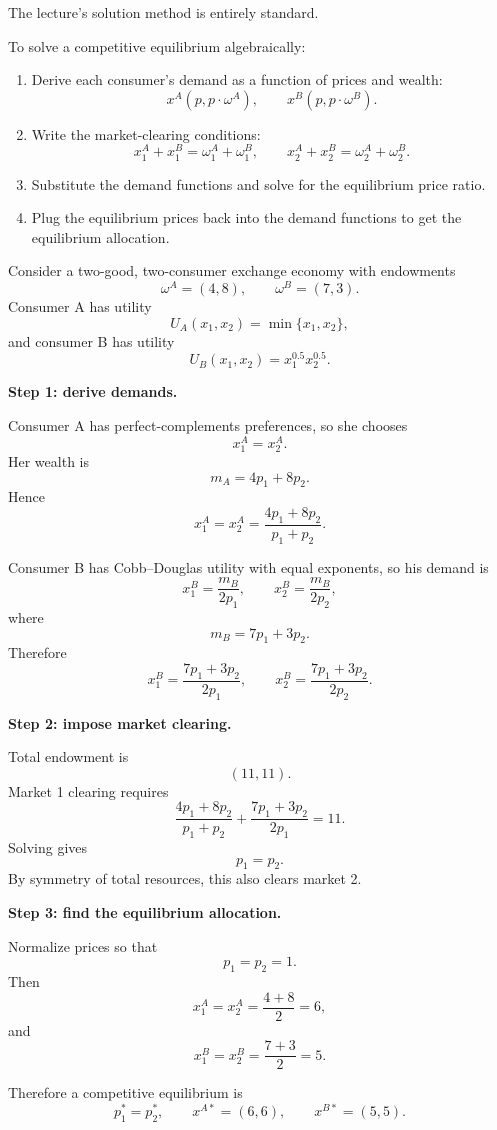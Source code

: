 The lecture's solution method is entirely standard.

\begin{examtip}[title={Method Pattern: Solving a 2-good, 2-consumer equilibrium}]
To solve a competitive equilibrium algebraically:
\begin{enumerate}
    \item Derive each consumer's demand as a function of prices and wealth:
    \[
    x^A(p,p\cdot \omega^A), \qquad x^B(p,p\cdot \omega^B).
    \]
    \item Write the market-clearing conditions:
    \[
    x_1^A + x_1^B = \omega_1^A+\omega_1^B,
    \qquad
    x_2^A + x_2^B = \omega_2^A+\omega_2^B.
    \]
    \item Substitute the demand functions and solve for the equilibrium price ratio.
    \item Plug the equilibrium prices back into the demand functions to get the equilibrium allocation.
\end{enumerate}
\end{examtip}

\begin{examplebox}[title={Worked Example: Solving for competitive equilibrium}]
Consider a two-good, two-consumer exchange economy with endowments
\[
\omega^A=(4,8),
\qquad
\omega^B=(7,3).
\]
Consumer A has utility
\[
U_A(x_1,x_2)=\min\{x_1,x_2\},
\]
and consumer B has utility
\[
U_B(x_1,x_2)=x_1^{0.5}x_2^{0.5}.
\]

\textbf{Step 1: derive demands.}

Consumer A has perfect-complements preferences, so she chooses
\[
x_1^A=x_2^A.
\]
Her wealth is
\[
m_A = 4p_1+8p_2.
\]
Hence
\[
x_1^A=x_2^A=\frac{4p_1+8p_2}{p_1+p_2}.
\]

Consumer B has Cobb--Douglas utility with equal exponents, so his demand is
\[
x_1^B=\frac{m_B}{2p_1},
\qquad
x_2^B=\frac{m_B}{2p_2},
\]
where
\[
m_B=7p_1+3p_2.
\]
Therefore
\[
x_1^B=\frac{7p_1+3p_2}{2p_1},
\qquad
x_2^B=\frac{7p_1+3p_2}{2p_2}.
\]

\textbf{Step 2: impose market clearing.}

Total endowment is
\[
(11,11).
\]
Market 1 clearing requires
\[
\frac{4p_1+8p_2}{p_1+p_2}
+
\frac{7p_1+3p_2}{2p_1}
=
11.
\]
Solving gives
\[
p_1=p_2.
\]
By symmetry of total resources, this also clears market 2.

\textbf{Step 3: find the equilibrium allocation.}

Normalize prices so that
\[
p_1=p_2=1.
\]
Then
\[
x_1^A=x_2^A=\frac{4+8}{2}=6,
\]
and
\[
x_1^B=x_2^B=\frac{7+3}{2}=5.
\]

Therefore a competitive equilibrium is
\[
\boxed{
p_1^*=p_2^*,
\qquad
x^{A*}=(6,6),
\qquad
x^{B*}=(5,5).
}
\]
\end{examplebox}

